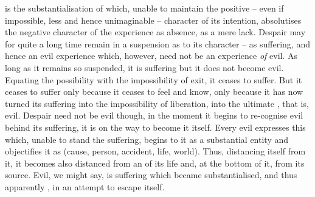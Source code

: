  is the {substantialisation} of  which, unable to
maintain the positive -- even if impossible, less and hence
unimaginable -- character of its intention, absolutises the negative character
of the experience as absence, as a mere lack.  Despair may for quite a long time
remain in a suspension as to its character -- as suffering, and hence an evil
experience which, however, need not be an experience {\em of} evil. As long as
it remains so suspended, it is suffering but it does not become evil.  Equating
the  possibility with the impossibility of exit, it ceases to
suffer. But it ceases to suffer only because it ceases to feel and know, only
because it has now turned its suffering into the  impossibility
of liberation, into the ultimate , that is, evil. Despair need
not be evil though, in the moment it begins to re-cognise evil behind its
suffering, it is on the way to become it itself. Every evil expresses this
 which, unable to stand the suffering, begins to 
it as a substantial entity and {objectifies} it as  (cause, person,
accident, life, world). Thus, distancing itself from it, it becomes also
distanced from an  of its life and, at the bottom of it, from its
source. Evil, we might say, is suffering which became substantialised, and thus
apparently , in an attempt to escape itself.


